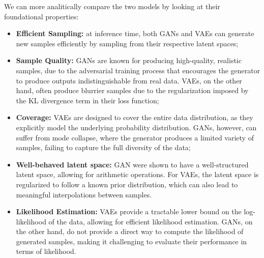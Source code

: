 We can more analitically compare the two models by looking at their foundational properties:

\begin{itemize}
    \item \textbf{Efficient Sampling:} at inference time, both GANs and VAEs can generate new samples efficiently by sampling from their respective latent spaces;
    \item \textbf{Sample Quality:} GANs are known for producing high-quality, realistic samples, due to the adversarial training process that encourages the generator to produce outputs indistinguishable from real data. 
    VAEs, on the other hand, often produce blurrier samples due to the regularization imposed by the KL divergence term in their loss function;
    \item \textbf{Coverage:} VAEs are designed to cover the entire data distribution, as they explicitly model the underlying probability distribution.
    GANs, however, can suffer from mode collapse, where the generator produces a limited variety of samples, failing to capture the full diversity of the data;
    \item \textbf{Well-behaved latent space:} GAN were shown to have a well-structured latent space, allowing for arithmetic operations. 
    For VAEs, the latent space is regularized to follow a known prior distribution, which can also lead to meaningful interpolations between samples.
    \item \textbf{Likelihood Estimation:} VAEs provide a tractable lower bound on the log-likelihood of the data, allowing for efficient likelihood estimation.
    GANs, on the other hand, do not provide a direct way to compute the likelihood of generated samples, making it challenging to evaluate their performance in terms of likelihood.
\end{itemize}